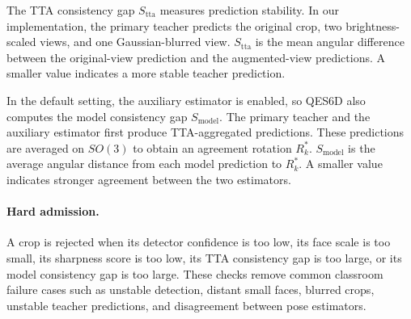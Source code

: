 \documentclass[preprint,12pt]{elsarticle}
\begin{document}
The TTA consistency gap $S_{\mathrm{tta}}$ measures prediction stability. In our implementation, the primary teacher predicts the original crop, two brightness-scaled views, and one Gaussian-blurred view. $S_{\mathrm{tta}}$ is the mean angular difference between the original-view prediction and the augmented-view predictions. A smaller value indicates a more stable teacher prediction.

In the default setting, the auxiliary estimator is enabled, so QES6D also computes the model consistency gap $S_{\mathrm{model}}$. The primary teacher and the auxiliary estimator first produce TTA-aggregated predictions. These predictions are averaged on $SO(3)$ to obtain an agreement rotation $R_k^*$. $S_{\mathrm{model}}$ is the average angular distance from each model prediction to $R_k^*$. A smaller value indicates stronger agreement between the two estimators.

\paragraph{Hard admission.}
A crop is rejected when its detector confidence is too low, its face scale is too small, its sharpness score is too low, its TTA consistency gap is too large, or its model consistency gap is too large. These checks remove common classroom failure cases such as unstable detection, distant small faces, blurred crops, unstable teacher predictions, and disagreement between pose estimators.
\end{document}
